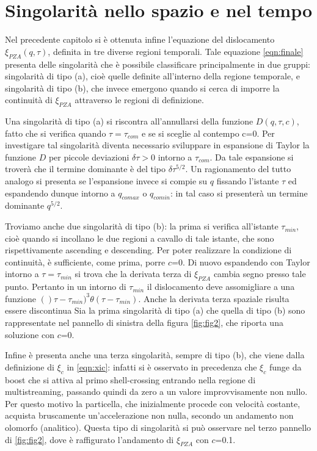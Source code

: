 \section{Singolarità nello spazio e nel tempo}

Nel precedente capitolo si è ottenuta infine l'equazione del dislocamento $\xi_{PZA}(q,\tau)$, definita in tre
diverse regioni temporali. Tale equazione \ref{eqn:finale} presenta delle singolarità che è possibile classificare
principalmente in due gruppi: singolarità di tipo (a), cioè quelle definite all'interno della regione temporale, e 
singolarità di tipo (b), che invece emergono quando si cerca di imporre la continuità di $\xi_{PZA}$ attraverso
le regioni di definizione. 

Una singolarità di tipo (a) si riscontra all'annullarsi della funzione $D(q, \tau, c)$, fatto che si verifica quando 
$\tau = \tau_{com}$ e se si sceglie al contempo c=0. Per investigare tal singolarità diventa necessario sviluppare
in espansione di Taylor la funzione $D$ per piccole deviazioni $\delta\tau>0$ intorno a $\tau_{com}$. Da tale espansione
si troverà che il termine dominante è del tipo $\delta\tau^{5/2}$. Un ragionamento del tutto analogo si presenta 
se l'espansione invece si compie su $q$ fissando l'istante $\tau$ ed espandendo dunque intorno a $q_{comax}$ o $q_{comin}$:
in tal caso si presenterà un termine dominante $q^{5/2}$. 

Troviamo anche due singolarità di tipo (b): la prima si verifica all'istante $\tau_{min}$, cioè quando si incollano 
le due regioni a cavallo di tale istante, che sono rispettivamente ascending e descending. Per poter realizzare la 
condizione di continuità, è sufficiente, come prima, porre $c$=0. Di nuovo espandendo con Taylor intorno a  $\tau = 
\tau_{min}$ si trova che la derivata terza di $\xi_{PZA}$ cambia segno presso tale punto. Pertanto in un intorno 
di $\tau_{min}$ il dislocamento deve assomigliare a una funzione $()\tau-\tau_{min})^3 \theta(\tau-\tau_{min})$.
Anche la derivata terza spaziale risulta essere discontinua
Sia la prima singolarità di tipo (a) che quella di tipo (b) sono rappresentate nel pannello di sinistra della figura
\ref{fig:fig2}, che riporta una soluzione con $c$=0.

Infine è presenta anche una terza singolarità, sempre di tipo (b), che viene dalla definizione di $\xi_c$ in \ref{eqn:xic}:
infatti si è osservato in precedenza che $\xi_c$ funge da boost che si attiva al primo shell-crossing entrando nella 
regione di multistreaming, passando quindi da zero a un valore improvvisamente non nullo. Per questo motivo la particella,
che inizialmente procede con velocità costante, acquista bruscamente un'accelerazione non nulla, secondo un andamento
non olomorfo (analitico). Questa tipo di singolarità si può osservare nel terzo pannello di \ref{fig:fig2}, dove è
raffigurato l'andamento di $\xi_{PZA}$ con $c$=0.1.

